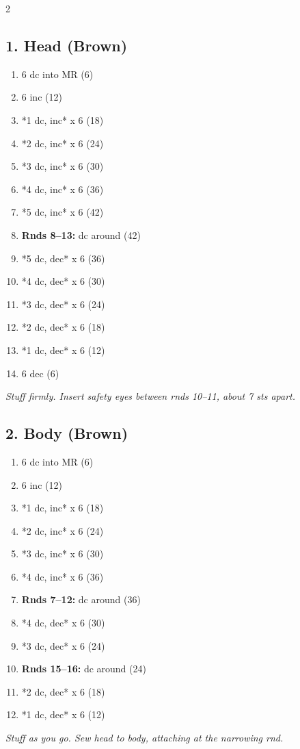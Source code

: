 
\begin{multicols}{2}

\subsection*{1. Head (Brown)}
\begin{enumerate}[noitemsep,leftmargin=*]
    \item 6 dc into MR (6)
    \item 6 inc (12)
    \item *1 dc, inc* x 6 (18)
    \item *2 dc, inc* x 6 (24)
    \item *3 dc, inc* x 6 (30)
    \item *4 dc, inc* x 6 (36)
    \item *5 dc, inc* x 6 (42)
    \item \textbf{Rnds 8--13:} dc around (42)
    \item *5 dc, dec* x 6 (36)
    \item *4 dc, dec* x 6 (30)
    \item *3 dc, dec* x 6 (24)
    \item *2 dc, dec* x 6 (18)
    \item *1 dc, dec* x 6 (12)
    \item 6 dec (6)
\end{enumerate}
\textit{Stuff firmly. Insert safety eyes between rnds 10--11, about 7 sts apart.}

\subsection*{2. Body (Brown)}
\begin{enumerate}[noitemsep,leftmargin=*]
    \item 6 dc into MR (6)
    \item 6 inc (12)
    \item *1 dc, inc* x 6 (18)
    \item *2 dc, inc* x 6 (24)
    \item *3 dc, inc* x 6 (30)
    \item *4 dc, inc* x 6 (36)
    \item \textbf{Rnds 7--12:} dc around (36)
    \item *4 dc, dec* x 6 (30)
    \item *3 dc, dec* x 6 (24)
    \item \textbf{Rnds 15--16:} dc around (24)
    \item *2 dc, dec* x 6 (18)
    \item *1 dc, dec* x 6 (12)
\end{enumerate}
\textit{Stuff as you go. Sew head to body, attaching at the narrowing rnd.}


\end{multicols}
